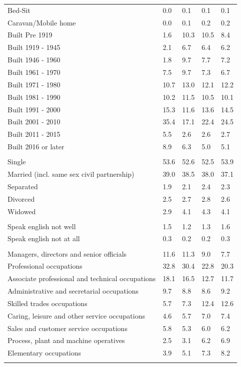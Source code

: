 \documentclass{article}
\begin{document}
\begin{table}[h]
\begin{tabular}{KTTTT}
Bed-Sit & 0.0& 0.1& 0.1& 0.1\\
Caravan/Mobile home & 0.0& 0.1& 0.2& 0.2\\
    \hline
Built Pre 1919 &  1.6& 10.3& 10.5&  8.4\\
Built 1919 - 1945 & 2.1& 6.7& 6.4& 6.2\\
Built  1946 - 1960 & 1.8& 9.7& 7.7& 7.2\\
Built  1961 - 1970 & 7.5& 9.7& 7.3& 6.7\\
Built  1971 - 1980 & 10.7& 13.0& 12.1& 12.2\\
Built  1981 - 1990 & 10.2& 11.5& 10.5& 10.1\\
Built  1991 - 2000 & 15.3& 11.6& 13.6& 14.5\\
Built  2001 - 2010 & 35.4& 17.1& 22.4& 24.5\\
Built  2011 - 2015 & 5.5& 2.6& 2.6& 2.7\\
Built  2016 or later & 8.9& 6.3& 5.0& 5.1\\
\hline
    \\
    \hline
Single & 53.6& 52.6& 52.5& 53.9\\
Married (incl. same sex civil partnership) & 39.0& 38.5& 38.0& 37.1\\
Separated  & 1.9& 2.1& 2.4& 2.3\\
Divorced  & 2.5& 2.7& 2.8& 2.6\\
Widowed & 2.9& 4.1& 4.3& 4.1\\
\hline
    \\ 
    \hline
Speak english not well & 1.5& 1.2& 1.3& 1.6\\
Speak english not at all & 0.3& 0.2& 0.2& 0.3\\
\hline
    \\
    \hline
Managers, directors and senior officials & 11.6& 11.3&  9.0&  7.7\\
Professional occupations & 32.8& 30.4& 22.8& 20.3\\
Associate professional and technical occupations & 18.1& 16.5& 12.7& 11.7\\
Administrative and secretarial occupations & 9.7& 8.8& 8.6& 9.2\\
Skilled trades occupations &  5.7&  7.3& 12.4& 12.6\\
Caring, leisure and other service occupations & 4.6& 5.7& 7.0& 7.4\\
Sales and customer service occupations & 5.8& 5.3& 6.0& 6.2\\
Process, plant and machine operatives & 2.5& 3.1& 6.2& 6.9\\
Elementary occupations & 3.9& 5.1& 7.3& 8.2\\
\hline
\end{tabular}
\end{table}
\end{document}
